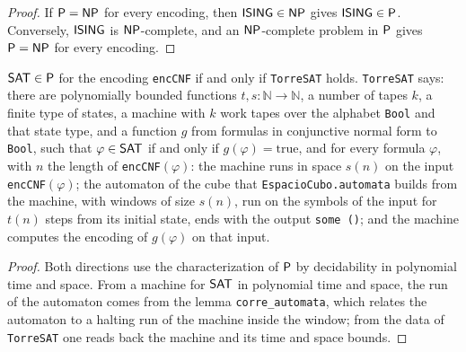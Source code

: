 \begin{proof}
  \leanok
  If $\mathsf{P} = \mathsf{NP}$ for every encoding, then $\mathsf{ISING} \in \mathsf{NP}$ gives $\mathsf{ISING} \in \mathsf{P}$. Conversely,
  $\mathsf{ISING}$ is $\mathsf{NP}$-complete, and an $\mathsf{NP}$-complete problem in $\mathsf{P}$ gives $\mathsf{P} = \mathsf{NP}$ for every
  encoding.
\end{proof}

\begin{theorem}
  \label{thm:arrow-sat-torre}
  \leanok
  $\mathsf{SAT} \in \mathsf{P}$ for the encoding \texttt{encCNF} if and only if \texttt{TorreSAT} holds. \texttt{TorreSAT}
  says: there are polynomially bounded functions $t, s : \mathbb{N} \to \mathbb{N}$, a number of tapes
  $k$, a finite type of states, a machine with $k$ work tapes over the alphabet \texttt{Bool} and
  that state type, and a function $g$ from formulas in conjunctive normal form to \texttt{Bool}, such
  that $\varphi \in \mathsf{SAT}$ if and only if $g(\varphi) = \mathrm{true}$, and for every formula $\varphi$,
  with $n$ the length of \texttt{encCNF}$(\varphi)$: the machine runs in space $s(n)$ on the input
  \texttt{encCNF}$(\varphi)$; the automaton of the cube that \texttt{EspacioCubo.automata} builds from the
  machine, with windows of size $s(n)$, run on the symbols of the input for $t(n)$ steps from its
  initial state, ends with the output \texttt{some ()}; and the machine computes the encoding of
  $g(\varphi)$ on that input.
  \own{}
\end{theorem}

\begin{proof}
  \leanok
  Both directions use the characterization of $\mathsf{P}$ by decidability in polynomial time and space.
  From a machine for $\mathsf{SAT}$ in polynomial time and space, the run of the automaton comes from the
  lemma \texttt{corre\_automata}, which relates the automaton to a halting run of the machine inside
  the window; from the data of \texttt{TorreSAT} one reads back the machine and its time and space
  bounds.
\end{proof}

